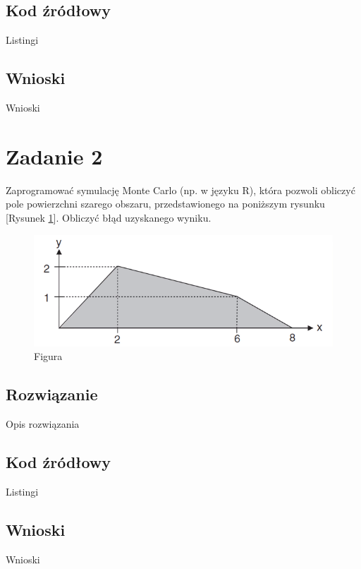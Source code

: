 \documentclass[a4paper,11pt,titlepage]{article}
\begin{document}
\subsection{Kod źródłowy}
Listingi

\subsection{Wnioski}
Wnioski

\section{Zadanie 2}
Zaprogramować symulację Monte Carlo (np. w języku R), która pozwoli obliczyć pole powierzchni szarego obszaru, przedstawionego na poniższym rysunku [Rysunek \ref{fig:wykres2}]. Obliczyć błąd uzyskanego wyniku.

\begin{figure}[H]
\centering
\includegraphics[width=1\columnwidth]{img/zad2.PNG}
\caption{Figura}
\label{fig:wykres2}
\end{figure}

\subsection{Rozwiązanie}
Opis rozwiązania

\subsection{Kod źródłowy}
Listingi

\subsection{Wnioski}
Wnioski
\end{document}
